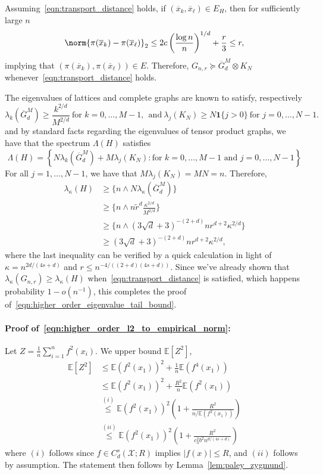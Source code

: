 \documentclass{article}
\newcommand{\abs}[1]{\left \lvert #1 \right \rvert}
\newcommand{\set}[1]{\left\{#1\right\}}
\newcommand{\1}{\mathbf{1}}
\newcommand{\Xset}{\mathcal{X}}
\newcommand{\Ebb}{\mathbb{E}}
\newcommand{\wt}[1]{\widetilde{#1}}
\newcommand{\ol}[1]{\overline{#1}}
\theoremstyle{alden}
\theoremstyle{aldenthm}
\theoremstyle{definition}
\theoremstyle{remark}
\begin{document}
Assuming~\eqref{eqn:transport_distance} holds, if $(\ol{x}_k, \ol{x}_{\ell}) \in E_H$, then for sufficiently large $n$
\begin{equation*}
\norm{\pi(\ol{x}_k) - \pi(\ol{x}_\ell)}_2 \leq 2 c \left(\frac{\log n}{n}\right)^{1/d} + \frac{r}{3} \leq r,
\end{equation*}
implying that $(\pi(\ol{x}_k), \pi(\ol{x}_{\ell})) \in E$. Therefore, $G_{n,r} \succeq \ol{G}^M_d \otimes K_N$ whenever~\eqref{eqn:transport_distance} holds.

The eigenvalues of lattices and complete graphs are known to satisfy, respectively
\begin{equation*}
\lambda_k(\ol{G}^{M}_d) \geq \frac{k^{2/d}}{M^{2/d}}~\textrm{for $k = 0,\ldots,M - 1$},~~ \textrm{and}~\lambda_{j}(K_N) \geq N\1\{j > 0\}~\textrm{for $j = 0,\ldots,N-1$.}
\end{equation*}
and by standard facts regarding the eigenvalues of tensor product graphs, we have that the spectrum $\Lambda(H)$ satisfies
\begin{equation*}
\Lambda(H) = \set{N\lambda_k(\ol{G}^{M}_d) + M\lambda_j(K_N): \textrm{for $k = 0,\ldots,M - 1$ and $j = 0,\ldots,N-1$}}
\end{equation*}
For all $j = 1,\ldots,N-1$, we have that $M\lambda_j(K_N) = MN = n$. Therefore,
\begin{align*}
\lambda_{\kappa}(H) & \geq \{n \wedge N\lambda_{\kappa}(\ol{G}^{M}_d)\} \\
& \geq \{n \wedge n\wt{r}^d\frac{\kappa^{2/d}}{M^{2/d}}\} \\
& \geq \{n \wedge (3\sqrt{d} + 3)^{-(2+d)}nr^{d+2}\kappa^{2/d}\} \\
& \geq (3\sqrt{d} + 3)^{-(2+d)}nr^{d+2}\kappa^{2/d},
\end{align*}
where the last inequality can be verified by a quick calculation in light of $\kappa = n^{2d/(4s + d)}$ and $r \leq n^{-4/((2+d)(4s + d))}$. Since we've already shown that $\lambda_{\kappa}(G_{n,r}) \geq \lambda_{\kappa}(H)$ when~\eqref{eqn:transport_distance} is satisfied, which happens probability $1 - o(n^{-1})$, this completes the proof of~\eqref{eqn:higher_order_eigenvalue_tail_bound}.

\paragraph{Proof of~\eqref{eqn:higher_order_l2_to_empirical_norm}:}

Let $Z = \frac{1}{n}\sum_{i = 1}^{n} f^2(x_i)$. We upper bound $\Ebb[Z^2]$,
\begin{align*}
\Ebb[Z^2] & \leq \Ebb(f^2(x_1))^2 + \frac{1}{n}\Ebb(f^4(x_1)) \\
& \leq \Ebb(f^2(x_1))^2 + \frac{R^2}{n}\Ebb(f^2(x_1)) \\
& \overset{(i)}{\leq} \Ebb(f^2(x_1))^2\left(1 + \frac{R^2}{n/\Ebb(f^2(x_1))}\right) \\
& \overset{(ii)}{\leq} \Ebb(f^2(x_1))^2\left(1 + \frac{R^2}{c_3^2 b^2 n^{d/(4s + d)}}\right)
\end{align*}
where $(i)$ follows since $f \in C_d^s(\Xset;R)$ implies $\abs{f(x)} \leq R$, and $(ii)$ follows by assumption. The statement then follows by Lemma~\ref{lem:paley_zygmund}.
\end{document}
